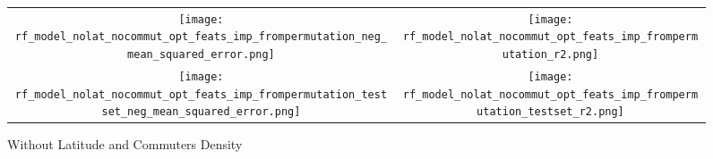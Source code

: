 \documentclass[varwidth, border=10pt]{standalone}
\begin{document}
\begin{figure*}
   \centering
\begin{tabular}{cc}
\texttt{[image: rf\_model\_nolat\_nocommut\_opt\_feats\_imp\_frompermutation\_neg\_mean\_squared\_error.png]}&
\texttt{[image: rf\_model\_nolat\_nocommut\_opt\_feats\_imp\_frompermutation\_r2.png]}\\
\texttt{[image: rf\_model\_nolat\_nocommut\_opt\_feats\_imp\_frompermutation\_testset\_neg\_mean\_squared\_error.png]}&
\texttt{[image: rf\_model\_nolat\_nocommut\_opt\_feats\_imp\_frompermutation\_testset\_r2.png]}\\
\end{tabular}
  \caption*{Without Latitude and Commuters Density}
\end{figure*}
\end{document}
